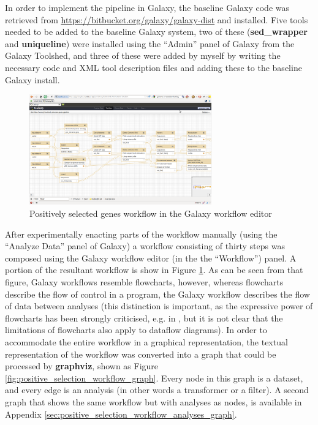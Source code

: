 \documentclass[a4paper,10pt]{scrreprt} \usepackage[utf8]{inputenc}
\begin{document}
In order to implement the pipeline in Galaxy, the baseline Galaxy code was retrieved from \url{https://bitbucket.org/galaxy/galaxy-dist} and installed. Five tools needed to be added to the baseline Galaxy system, two of these (\textbf{sed\_wrapper} and \textbf{uniqueline}) were installed using the ``Admin'' panel of Galaxy from the Galaxy Toolshed, and three of these were added by myself by writing the necessary code and XML tool description files and adding these to the baseline Galaxy install.

\begin{figure}[!htb]
\centering
\includegraphics[width=0.7\textwidth]{images/GalaxyPositiveSelectionPipeline.png}
\caption{Positively selected genes workflow in the Galaxy workflow editor}
\label{fig:GalaxyPositiveSelectionPipeline}
\end{figure}

After experimentally enacting parts of the workflow manually (using the ``Analyze Data'' panel of Galaxy) a workflow consisting of thirty steps was composed using the Galaxy workflow editor (in the the ``Workflow'') panel. A portion of the resultant workflow is show in Figure \ref{fig:GalaxyPositiveSelectionPipeline}. As can be seen from that figure, Galaxy workflows resemble flowcharts, however, whereas flowcharts describe the flow of control in a program, the Galaxy workflow describes the flow of data between analyses (this distinction is important, as the expressive power of flowcharts has been strongly criticised, e.g. in \cite{brooks_mythical_1995}, but it is not clear that the limitations of flowcharts also apply to dataflow diagrams). In order to accommodate the entire workflow in a graphical representation, the textual representation of the workflow was converted into a graph that could be processed by \textbf{graphviz}, shown as Figure \ref{fig:positive_selection_workflow_graph}. Every node in this 
graph is a dataset, and every edge is an analysis (in other words a transformer or a filter). A second graph that shows the same workflow but with analyses as nodes, is available in Appendix \ref{sec:positive_selection_workflow_analyses_graph}.
\end{document}
